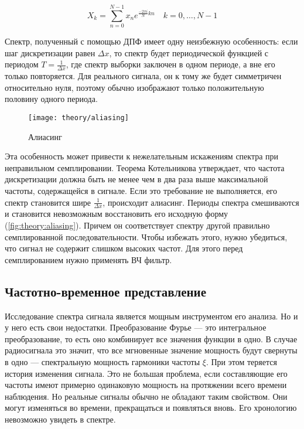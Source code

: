 \begin{equation}
  \label{eq:theory:discrete_fourier}
  X_k = \sum_{n=0}^{N-1} x_n e^{\frac{-2 \pi i}{N} k n} \quad k = 0, \dotsc, N-1
\end{equation}

Спектр, полученный с помощью ДПФ имеет одну неизбежную особенность: если шаг дискретизации равен $\Delta x$, то спектр будет периодической функцией с периодом $T = \frac{1}{\Delta x}$, где спектр выборки заключен в одном периоде, а вне его только повторяется. Для реального сигнала, он к тому же будет симметричен относительно нуля, поэтому обычно изображают только положительную половину одного периода.

\begin{figure}[h]
  \centering
  \texttt{[image: theory/aliasing]}
  \caption{Алиасинг}
  \label{fig:theory:aliasing}
\end{figure}

Эта особенность может привести к нежелательным искажениям спектра при неправильном семплировании. Теорема Котельникова утверждает, что частота дискретизации должна быть не менее чем в два раза выше максимальной частоты, содержащейся в сигнале. Если это требование не выполняется, его спектр становится шире $\frac{1}{\Delta x}$, происходит алиасинг. Периоды спектра смешиваются и становится невозможным восстановить его исходную форму (\autoref{fig:theory:aliasing}). Причем он соответствует спектру другой правильно семплированной последовательности. Чтобы избежать этого, нужно убедиться, что сигнал не содержит слишком высоких частот. Для этого перед семплированием нужно применять ВЧ фильтр.


\subsection{Частотно-временное представление}

Исследование спектра сигнала является мощным инструментом его анализа. Но и у него есть свои недостатки. Преобразование Фурье --- это интегральное преобразование, то есть оно комбинирует все значения функции в одно. В случае радиосигнала это значит, что все мгновенные значение мощность будут свернуты в одно --- спектральную мощность гармоники частоты $\xi$. При этом теряется история изменения сигнала. Это не большая проблема, если составляющие его частоты имеют примерно одинаковую мощность на протяжении всего времени наблюдения. Но реальные сигналы обычно не обладают таким свойством. Они могут изменяться во времени, прекращаться и появляться вновь. Его хронологию невозможно увидеть в спектре.

